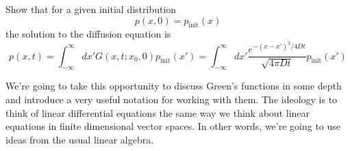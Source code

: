 

Show that for a given initial distribution
\begin{equation*}
  p(x, 0) = p_\text{init}(x)
\end{equation*}
the solution to the diffusion equation is
\begin{equation*}
  p(x, t)
  = \int_{-\infty}^\infty dx' G(x, t; x_0, 0) p_\text{init}(x')
  = \int_{-\infty}^\infty dx' \frac{e^{-(x - x')^2/4Dt}}{\sqrt{4 \pi D t}} p_\text{init}(x')
\end{equation*}



We're going to take this opportunity to discuss Green's functions in some depth and introduce a very useful notation for working with them.
The ideology is to think of linear differential equations the same way we think about linear equations in finite dimensional vector spaces.
In other words, we're going to use ideas from the usual linear algebra.



